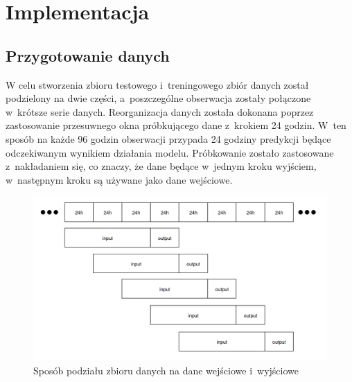 \section{Implementacja}

\subsection{Przygotowanie danych}

W celu stworzenia zbioru testowego i~treningowego zbiór danych został podzielony
na dwie części, a~poszczególne obserwacja zostały połączone w~krótsze serie danych.
Reorganizacja danych została dokonana poprzez zastosowanie przesuwnego okna próbkującego
dane z~krokiem 24 godzin. W~ten sposób na każde 96 godzin obserwacji przypada 24 godziny predykcji
będące odczekiwanym wynikiem działania modelu. Próbkowanie zostało zastosowane z~nakładaniem się,
co znaczy, że dane będące w~jednym kroku wyjściem, w~następnym kroku są używane jako dane wejściowe.

\begin{figure}[H]
    \centering
    \includegraphics[width=\textwidth]{images/division.png}
    \caption{Sposób podziału zbioru danych na dane wejściowe i~wyjściowe}
    \label{division}
\end{figure}


